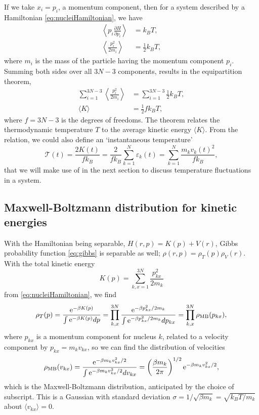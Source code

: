 \documentclass[11pt,bibliography=totoc,index=totoc]{scrbook}   %
\begin{document}
If we take $x_i = p_i$, a momentum component, then for a system described by a Hamiltonian \eqref{eq:nucleiHamiltonian}, we have
\begin{align}
  \left\langle p_i \frac{\partial H}{\partial p_i}\right\rangle &= k_BT,  \\
  \left\langle \frac{p_i^2}{2m_i}\right\rangle &= \frac12k_BT,
\end{align}
where $m_i$ is the mass of the particle having the momentum component $p_i$. 
Summing both sides over all $3N-3$ components, results in the equipartition theorem,
\begin{align}
  \sum_{i=1}^{3N-3} \left\langle\frac{p_i^2}{2m_i} \right\rangle &= \sum_{i=1}^{3N-3} \frac12 k_BT, \\
  \langle K \rangle &= \frac12 f k_BT,
  \label{eq:temp}
\end{align}
where $f = 3N-3$ is the degrees of freedoms. 
The theorem relates the thermodynamic temperature $T$ to the average kinetic energy $\langle K \rangle$.
From the relation, we could also define an `instantaneous temperature'
\begin{equation}
    \mathcal{T}(t) = \frac{2K(t)}{fk_B} = \frac{2}{fk_B} \sum_{k=1}^N \varepsilon_k(t) = \sum_{k=1}^N \frac{m_k v_k(t)^2}{fk_B},
  \label{eq:kinetictemp}
\end{equation}
that we will make use of in the next section to discuss temperature fluctuations in a system.

%
\subsection{Maxwell-Boltzmann distribution for kinetic energies}\label{sec:maxwell-boltzmann}
%

With the Hamiltonian being separable, $H(r,p) = K(p) + V(r)$, Gibbs probability function \eqref{eq:gibbs} 
is separable as well; $\rho(r,p)=\rho_T(p)\rho_V(r)$. With the total kinetic energy
\begin{equation}
    K(p) = \sum_{k,x=1}^{3N} \frac{p_{kx}^2}{2m_k}
\end{equation}
from \eqref{eq:nucleiHamiltonian}, we find
\begin{equation}
    \rho_T(p) = \frac{\mathrm{e}^{-\beta K(p)}}{\int \mathrm{e}^{-\beta K(p)} dp} = \prod_{k,x}^{3N} \frac{\mathrm{e}^{-\beta p_{kx}^2/2m_k}}{\int \mathrm{e}^{-\beta p_{kx}^2/2m_k} dp_{kx}}
    = \prod_{k,x}^{3N} \rho_{\text{MB}}(p_{kx}),
\end{equation}
where $p_{kx}$ is a momentum component for nucleus $k$, related to a velocity component by $p_{kx}=m_k v_{kx}$,
so we can find the distribution of velocities
\begin{equation}
    \rho_{\text{MB}}(v_{kx}) = \frac{\mathrm{e}^{-\beta m_k v_{kx}^2/2}}{\int \mathrm{e}^{-\beta m_k v_{kx}^2/2} dv_{kx}} = \left(\frac{\beta m_k}{2\pi}\right)^{1/2} \mathrm{e}^{-\beta m_k v_{kx}^2/2},
    \label{eq:maxwell-boltzmann}
\end{equation}
which is the Maxwell-Boltzmann distribution, anticipated by the choice of subscript. 
This is a Gaussian with standard deviation $\sigma = 1/\sqrt{\beta m_k} = \sqrt{k_BT/m_k}$ about $\langle v_{kx} \rangle = 0$.
\end{document}
